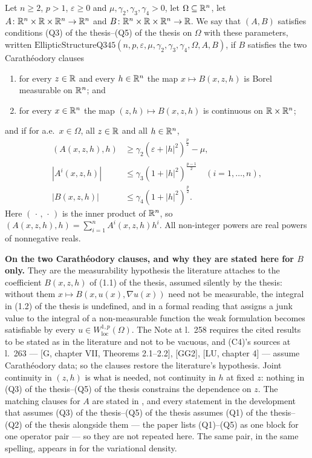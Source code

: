 \begin{definition}
Let $n\ge2$, $p>1$, $\varepsilon\ge0$ and $\mu,\gamma_2,\gamma_3,\gamma_4>0$, let
$\Omega\subseteq\mathbb{R}^n$, let $A\colon\mathbb{R}^n\times\mathbb{R}\times\mathbb{R}^n\to\mathbb{R}^n$ and
$B\colon\mathbb{R}^n\times\mathbb{R}\times\mathbb{R}^n\to\mathbb{R}$.  We say that $(A,B)$ satisfies conditions
(Q3) of the thesis--(Q5) of the thesis on $\Omega$ with these parameters, written
$\mathrm{EllipticStructureQ345}(n,p,\varepsilon,\mu,\gamma_2,\gamma_3,\gamma_4,\Omega,A,B)$,
if $B$ satisfies the two Carath\'eodory clauses
\begin{enumerate}
\item for every $z\in\mathbb{R}$ and every $h\in\mathbb{R}^n$ the map $x\mapsto B(x,z,h)$ is
  Borel measurable on $\mathbb{R}^n$; and
\item for every $x\in\mathbb{R}^n$ the map $(z,h)\mapsto B(x,z,h)$ is continuous on
  $\mathbb{R}\times\mathbb{R}^n$;
\end{enumerate}
and if for a.e.\ $x\in\Omega$, all $z\in\mathbb{R}$ and all $h\in\mathbb{R}^n$,
\begin{align*}
(A(x,z,h),h)&\ge\gamma_2(\varepsilon+|h|^2)^{\frac p2}-\mu, \tag{Q3}\\
|A^i(x,z,h)|&\le\gamma_3(1+|h|^2)^{\frac{p-1}2}\quad(i=1,\dots,n), \tag{Q4}\\
|B(x,z,h)|&\le\gamma_4(1+|h|^2)^{\frac p2}. \tag{Q5}
\end{align*}
Here $(\,\cdot\,,\,\cdot\,)$ is the inner product of $\mathbb{R}^n$, so
$(A(x,z,h),h)=\sum_{i=1}^nA^i(x,z,h)h^i$.  All non-integer powers are real
powers of nonnegative reals.

\noindent\textbf{On the two Carath\'eodory clauses, and why they are stated here
for $B$ only.}  They are the measurability hypothesis the literature attaches to
the coefficient $B(x,z,h)$ of (1.1) of the thesis, assumed silently by the thesis:
without them $x\mapsto B(x,u(x),\nabla u(x))$ need not be measurable, the
integral in (1.2) of the thesis is undefined, and in a formal reading that assigns a
junk value to the integral of a non-measurable function the weak formulation
becomes satisfiable by every $u\in W^{1,p}_{\mathrm{loc}}(\Omega)$.  The Note at
l.~258 requires the cited results to be stated as in the literature and not to be
vacuous, and (C4)'s sources at l.~263 --- [G, chapter VII, Theorems 2.1--2.2],
[GG2], [LU, chapter 4] --- assume Carath\'eodory data; so the clauses restore the
literature's hypothesis.  Joint continuity in $(z,h)$ is what is needed, not
continuity in $h$ at fixed $z$: nothing in (Q3) of the thesis--(Q5) of the thesis
constrains the dependence on $z$.  The matching clauses for $A$ are stated in
, and every statement in the development that
assumes (Q3) of the thesis--(Q5) of the thesis assumes (Q1) of the thesis--(Q2) of the thesis
alongside them --- the paper lists (Q1)--(Q5) as one block for one operator pair
--- so they are not repeated here.  The same pair, in the same spelling, appears
in  for the variational density.
\end{definition}
